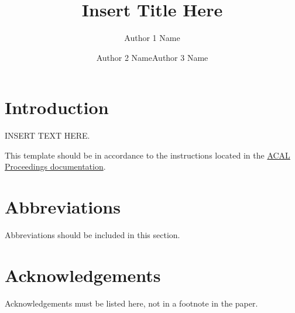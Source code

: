 \documentclass[output=paper,colorlinks,citecolor=brown,
]{langscibook}
\author{Author 1 Name\affiliation{Author 1 Affiliation}\and Author 2 Name\affiliation{Author 2 Affiliation}\lastand  Author 3 Name\affiliation{Author 3 Affiliation}}
\title{Insert Title Here}
\begin{document}
\maketitle

\section{Introduction}

INSERT TEXT HERE. 

\noindent This template should be in accordance to the instructions located in the \href{https://acal.linguistlist.org/annual-conference-proceedings}{ACAL Proceedings documentation}.

\section*{Abbreviations}

Abbreviations should be included in this section. 

\section*{Acknowledgements}

Acknowledgements must be listed here, not in a footnote in the paper.

\sloppy %

\printbibliography[heading=subbibliography,notkeyword=this]
\end{document}
